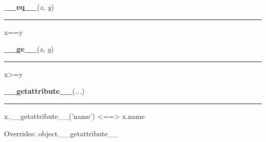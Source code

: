     \label{list:__eq__}

    \vspace{0.5ex}

    \begin{boxedminipage}{\textwidth}

    \raggedright \textbf{\_\_eq\_\_}(\textit{x}, \textit{y})

    \vspace{-1.5ex}

    \rule{\textwidth}{0.5\fboxrule}

x==y
    \vspace{1ex}

    \end{boxedminipage}

    \label{list:__ge__}

    \vspace{0.5ex}

    \begin{boxedminipage}{\textwidth}

    \raggedright \textbf{\_\_ge\_\_}(\textit{x}, \textit{y})

    \vspace{-1.5ex}

    \rule{\textwidth}{0.5\fboxrule}

x{\textgreater}=y
    \vspace{1ex}

    \end{boxedminipage}

    \vspace{0.5ex}

    \begin{boxedminipage}{\textwidth}

    \raggedright \textbf{\_\_getattribute\_\_}(\textit{...})

    \vspace{-1.5ex}

    \rule{\textwidth}{0.5\fboxrule}

x.{\_}{\_}getattribute{\_}{\_}('name') {\textless}=={\textgreater} x.name
    \vspace{1ex}

      Overrides: object.\_\_getattribute\_\_

    \end{boxedminipage}

    \label{list:__getitem__}

